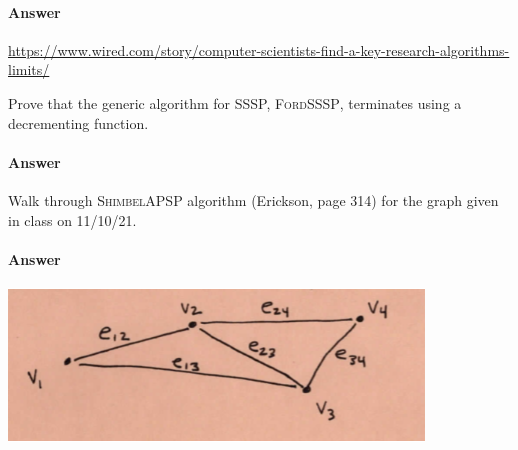 \documentclass{article}
\begin{document}
\paragraph{Answer}
\url{https://www.wired.com/story/computer-scientists-find-a-key-research-algorithms-limits/}


Prove that the generic algorithm for SSSP, \textsc{FordSSSP}, terminates using a
decrementing function.

\paragraph{Answer}


Walk through \textsc{ShimbelAPSP} algorithm (Erickson, page 314) for the graph given in class on
11/10/21.

\paragraph{Answer}
\includegraphics{graph.png}
\end{document}
